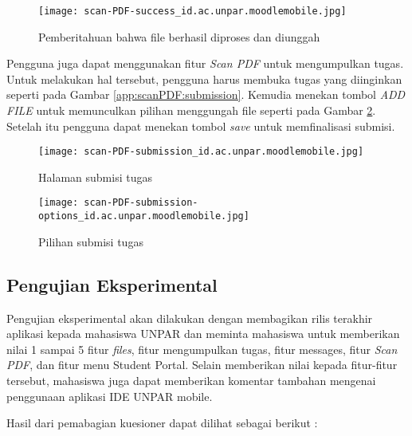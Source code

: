 \begin{figure}[H] 
	\centering  
	\texttt{[image: scan-PDF-success\_id.ac.unpar.moodlemobile.jpg]}  
	\caption[Pemberitahuan bahwa file berhasil diproses dan diunggah] {Pemberitahuan bahwa file berhasil diproses dan diunggah} 
	\label{app:scanPDF:success} 
\end{figure}  

Pengguna juga dapat menggunakan fitur \textit{Scan PDF} untuk mengumpulkan tugas. Untuk melakukan hal tersebut, pengguna harus membuka tugas yang diinginkan seperti pada Gambar \ref{app:scanPDF:submission}. Kemudia menekan tombol \textit{ADD FILE} untuk memunculkan pilihan menggungah file seperti pada Gambar \ref{app:scanPDF:submission:options}. Setelah itu pengguna dapat menekan tombol \textit{save} untuk memfinalisasi submisi.

\begin{figure}[H]
	\centering
	\begin{minipage}{.3\textwidth}
	\centering  
	\texttt{[image: scan-PDF-submission\_id.ac.unpar.moodlemobile.jpg]}  
	\caption[Halaman submisi tugas] {Halaman submisi tugas} 
	\label{app:scanPDF:submission} 
	\end{minipage}
	\hspace{.3\textwidth}
	\begin{minipage}{.3\textwidth}
	\centering  
	\texttt{[image: scan-PDF-submission-options\_id.ac.unpar.moodlemobile.jpg]}  
	\caption[Pilihan submisi tugas] {Pilihan submisi tugas} 
	\label{app:scanPDF:submission:options} 
	\end{minipage}
\end{figure}

\subsection{Pengujian Eksperimental}

Pengujian eksperimental akan dilakukan dengan membagikan rilis terakhir aplikasi kepada mahasiswa UNPAR dan meminta mahasiswa untuk memberikan nilai 1 sampai 5 fitur \textit{files}, fitur mengumpulkan tugas, fitur messages, fitur \textit{Scan PDF}, dan fitur menu Student Portal. Selain memberikan nilai kepada fitur-fitur tersebut, mahasiswa juga dapat memberikan komentar tambahan mengenai penggunaan aplikasi IDE UNPAR mobile.

Hasil dari pemabagian kuesioner dapat dilihat sebagai berikut :

